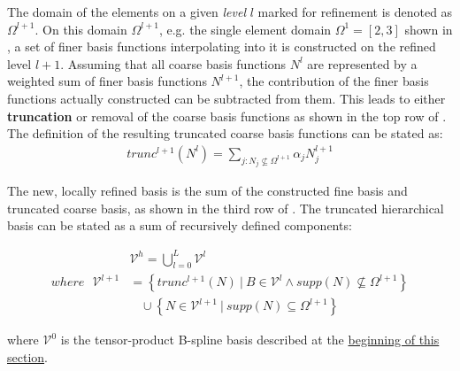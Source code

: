 The domain of the elements on a given \emph{level} $l$ marked for refinement is denoted as $\Omega^{l+1}$. On this domain $\Omega^{l+1}$, e.g. the single element domain $\Omega^{1} = [2,3]$ shown in , a set of finer basis functions interpolating into it is constructed on the refined level $l+1$. Assuming that all coarse basis functions $N^l$ are represented by a weighted sum of finer basis functions $N^{l+1}$, the contribution of the finer basis functions actually constructed can be subtracted from them. This leads to either \textbf{truncation} or removal of the coarse basis functions as shown in the top row of . The definition of the resulting truncated coarse basis functions can be stated as:
\begin{equation}
\label{eqn:truncation}
\begin{split}
    trunc^{l+1}(N^l) = \sum_{j: N_j \nsubseteq \Omega^{l+1}} \alpha_j N_j^{l+1}
\end{split}{}
\end{equation}{}

The new, locally refined basis is the sum of the constructed fine basis and truncated coarse basis, as shown in the third row of . The truncated hierarchical basis can be stated as a sum of recursively defined components:

\begin{equation}
\label{eqn:thb_basis}
\begin{split}
    &\mathcal{V}^{h} = \bigcup_{l=0}^{L} \mathcal{V}^{l} \\
    where ~~~\mathcal{V}^{l+1} &= \left\{ trunc^{l+1}(N) \ | \ B \in \mathcal{V}^l \land supp(N) \nsubseteq \Omega^{l+1}  \right\} \\
    & \ \ \ \ \cup \left\{ N \in \mathcal{V}^{l+1} \ | \ supp(N) \subseteq \Omega^{l+1}  \right\}
\end{split}{}
\end{equation}{}

where $\mathcal{V}^{0}$ is the tensor-product B-spline basis described at the \hyperref[sec:overview_background]{beginning of this section}.

